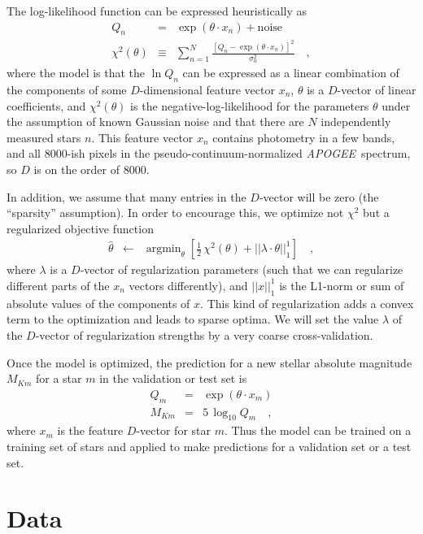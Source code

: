 \documentclass[modern]{aastex62}
\newcommand{\acronym}[1]{{\small{#1}}}
\newcommand{\project}[1]{\textsl{#1}}
\newcommand{\apogee}{\project{\acronym{APOGEE}}}
\DeclareMathOperator*{\argmin}{argmin}
\begin{document}
The log-likelihood function can be expressed heuristically as
\begin{eqnarray}
Q_n &=& \exp(\theta\cdot x_n) + \mbox{noise}
\\
\chi^2(\theta) &\equiv& \sum_{n=1}^N \frac{[Q_n - \exp(\theta\cdot x_n)]^2}{\sigma_n^2}
\quad ,
\end{eqnarray}
where
the model is that the $\ln Q_n$ can be expressed as a linear combination of the components
of some $D$-dimensional feature vector $x_n$,
$\theta$ is a $D$-vector of linear coefficients,
and $\chi^2(\theta)$ is the negative-log-likelihood for the parameters $\theta$
under the assumption of known Gaussian noise and
that there are $N$ independently measured stars $n$.
This feature vector $x_n$ contains photometry in a few bands, and all 8000-ish pixels
in the pseudo-continuum-normalized \apogee\ spectrum, so $D$ is on the order of 8000.

In addition, we assume that many entries in the $D$-vector will be zero
(the ``sparsity'' assumption).
In order to encourage this, we optimize not $\chi^2$ but a regularized objective function
\begin{eqnarray}
\hat{\theta} &\leftarrow& \argmin_{\theta}\left[\frac{1}{2}\,\chi^2(\theta) + ||\lambda\cdot\theta||_1^1\right]
\quad ,
\end{eqnarray}
where
$\lambda$ is a $D$-vector of regularization parameters (such that we can regularize
different parts of the $x_n$ vectors differently),
and $||x||_1^1$ is the L1-norm or sum of absolute values of the components of $x$.
This kind of regularization adds a convex term to the optimization and leads to
sparse optima.
We will set the value $\lambda$ of the $D$-vector of regularization strengths by a
very coarse cross-validation.

Once the model is optimized, the prediction for a new stellar absolute magnitude
$M_{Km}$ for a star $m$ in the validation or test set is
\begin{eqnarray}
Q_m &=& \exp(\theta\cdot x_m)
\\
M_{Km} &=& 5\,\log_{10} Q_m
\quad ,
\end{eqnarray}
where $x_m$ is the feature $D$-vector for star $m$.
Thus the model can be trained on a training set of stars and applied to make
predictions for a validation set or a test set.

\section{Data}
\end{document}
